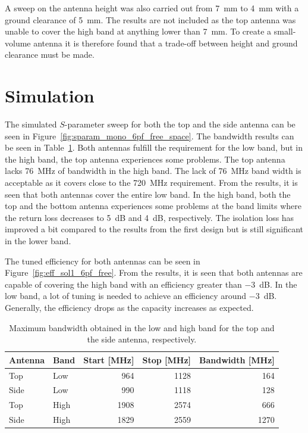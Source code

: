 A sweep on the antenna height was also carried out from \SI{7}{mm} to \SI{4}{mm} with a ground clearance of \SI{5}{mm}. The results are not included as the top antenna was unable to cover the high band at anything lower than \SI{7}{mm}. To create a small-volume antenna it is therefore found that a trade-off between height and ground clearance must be made.

\FloatBarrier
\section{Simulation}

The simulated $S$-parameter sweep for both the top and the side antenna can be seen in Figure~\ref{fig:sparam_mono_6pf_free_space}. The bandwidth results can be seen in Table~\ref{tab:bw_sol1_6pf}. Both antennas fulfill the requirement for the low band, but in the high band, the top antenna experiences some problems. The top antenna lacks \SI{76}{MHz} of bandwidth in the high band. The lack of \SI{76}{MHz} band width is acceptable as it covers close to the \SI{720}{MHz} requirement.
From the results, it is seen that both antennas cover the entire low band. In the high band, both the top and the bottom antenna experiences some problems at the band limits where the return loss decreases to \SI{5}{dB} and \SI{4}{dB}, respectively. The isolation loss has improved a bit compared to the results from the first design but is still significant in the lower band.     

The tuned efficiency for both antennas can be seen in Figure~\ref{fig:eff_sol1_6pf_free}. From the results, it is seen that both antennas are capable of covering the high band with an efficiency greater than \SI{-3}{dB}. In the low band, a lot of tuning is needed to achieve an efficiency around \SI{-3}{dB}. Generally, the efficiency drops as the capacity increases as expected.

\begin{table}
  \centering
  \begin{tabular}{|l|l|r|r|r|}
    \hline
    Antenna & Band & Start [MHz] & Stop [MHz] & Bandwidth [MHz] \\
    \hline
    Top     & Low  & 964         & 1128      & 164 \\
    Side    & Low  & 990         & 1118      & 128 \\
    \hline
    Top     & High & 1908        & 2574       & 666 \\
    Side    & High & 1829        & 2559      & 1270 \\
    \hline
  \end{tabular}
  \caption{Maximum bandwidth obtained in the low and high band for the top and the side antenna, respectively.}
  \label{tab:bw_sol1_6pf}
\end{table}

